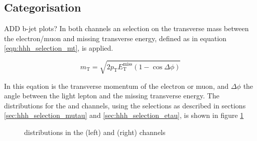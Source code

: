 \subsection{Categorisation}
\label{sec:hhh_selection_categories}
ADD b-jet plots?
In both channels an selection on the transverse mass \mT between the electron/muon
and missing transverse energy, defined as in equation \ref{eqn:hhh_selection_mt}, is applied.

\begin{equation}\label{eqn:hhh_selection_mt}
m_{\text{T}} = \sqrt{2p_{\text{T}}E_{\text{T}}^{\text{miss}}(1-\cos{\Delta\phi})}
\end{equation}

In this eqation \pT is the transverse momentum of the electron or muon, and $\Delta\phi$ the angle
between the light lepton and the missing transverse energy. The \mT distributions for the \etau
and \mutau channels, using the selections as
described in sections \ref{sec:hhh_selection_mutau} and \ref{sec:hhh_selection_etau},
is shown in figure \ref{fig:Hhh_selection_mt}

\begin{figure}[h!]
\begin{center}
\end{center}
\caption{\mT distributions in the \mutau (left) and \etau (right) channels}
\label{fig:Hhh_selection_mt}
\end{figure}

